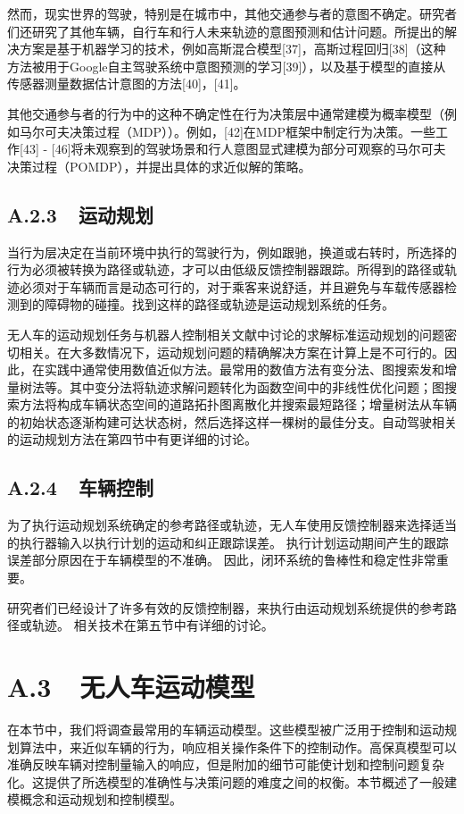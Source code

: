 然而，现实世界的驾驶，特别是在城市中，其他交通参与者的意图不确定。研究者们还研究了其他车辆，自行车和行人未来轨迹的意图预测和估计问题。所提出的解决方案是基于机器学习的技术，例如高斯混合模型[37]，高斯过程回归[38]（这种方法被用于Google自主驾驶系统中意图预测的学习[39]），以及基于模型的直接从传感器测量数据估计意图的方法[40]，[41]。

其他交通参与者的行为中的这种不确定性在行为决策层中通常建模为概率模型（例如马尔可夫决策过程（MDP））。例如，[42]在MDP框架中制定行为决策。一些工作[43] - [46]将未观察到的驾驶场景和行人意图显式建模为部分可观察的马尔可夫决策过程（POMDP），并提出具体的求近似解的策略。

\subsection*{A.2.3\ \ 运动规划}
当行为层决定在当前环境中执行的驾驶行为，例如跟驰，换道或右转时，所选择的行为必须被转换为路径或轨迹，才可以由低级反馈控制器跟踪。所得到的路径或轨迹必须对于车辆而言是动态可行的，对于乘客来说舒适，并且避免与车载传感器检测到的障碍物的碰撞。找到这样的路径或轨迹是运动规划系统的任务。

无人车的运动规划任务与机器人控制相关文献中讨论的求解标准运动规划的问题密切相关。在大多数情况下，运动规划问题的精确解决方案在计算上是不可行的。因此，在实践中通常使用数值近似方法。最常用的数值方法有变分法、图搜索发和增量树法等。其中变分法将轨迹求解问题转化为函数空间中的非线性优化问题；图搜索方法将构成车辆状态空间的道路拓扑图离散化并搜索最短路径；增量树法从车辆的初始状态逐渐构建可达状态树，然后选择这样一棵树的最佳分支。自动驾驶相关的运动规划方法在第四节中有更详细的讨论。

\subsection*{A.2.4\ \ 车辆控制}
为了执行运动规划系统确定的参考路径或轨迹，无人车使用反馈控制器来选择适当的执行器输入以执行计划的运动和纠正跟踪误差。 执行计划运动期间产生的跟踪误差部分原因在于车辆模型的不准确。 因此，闭环系统的鲁棒性和稳定性非常重要。

研究者们已经设计了许多有效的反馈控制器，来执行由运动规划系统提供的参考路径或轨迹。 相关技术在第五节中有详细的讨论。

\section*{A.3\ \ 无人车运动模型}
在本节中，我们将调查最常用的车辆运动模型。这些模型被广泛用于控制和运动规划算法中，来近似车辆的行为，响应相关操作条件下的控制动作。高保真模型可以准确反映车辆对控制量输入的响应，但是附加的细节可能使计划和控制问题复杂化。这提供了所选模型的准确性与决策问题的难度之间的权衡。本节概述了一般建模概念和运动规划和控制模型。

